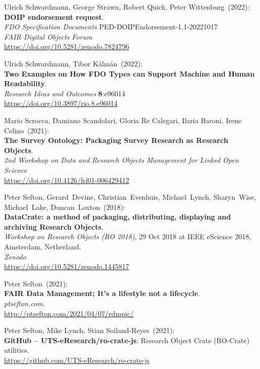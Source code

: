 \begin{thebibliography}{9}
Ulrich Schwardmann, George Strawn, Robert Quick, Peter Wittenburg~(2022): \\
\textbf{DOIP endorsement request}.\\
\emph{FDO Specification Documents} PED-DOIPEndorsement-1.1-20221017\\
\emph{FAIR Digital Objects Forum}\\
\url{https://doi.org/10.5281/zenodo.7824796}

Ulrich Schwardmann, Tibor Kálmán~(2022): \\
\textbf{Two {Examples} on {How FDO Types} can {Support Machine} and {Human Readability}}.\\
\emph{Research Ideas and Outcomes} \textbf{8}:e96014 \\
\url{https://doi.org/10.3897/rio.8.e96014}

Mario Scrocca, Damiano Scandolari, Gloria Re Calegari, Ilaria Baroni, Irene Celino~(2021): \\
\textbf{The Survey Ontology: Packaging Survey Research as Research Objects}.\\
\emph{2nd Workshop on Data and Research Objects Management for Linked Open Science}\\
\url{https://doi.org/10.4126/frl01-006429412}

Peter Sefton, Gerard~Devine, Christian~Evenhuis, Michael~Lynch, Sharyn~Wise, Michael~Lake, Duncan~Loxton~(2018): \\
\textbf{DataCrate: a method of packaging, distributing, displaying and archiving Research Objects}.\\
\emph{Workshop on Research Objects (RO 2018)}, 29 Oct 2018 at IEEE eScience 2018, Amsterdam, Netherland. \\
\emph{Zenodo}\\
\url{https://doi.org/10.5281/zenodo.1445817}

Peter Sefton~(2021): \\
\textbf{FAIR Data Management; It's a lifestyle not a lifecycle}.\\
\emph{ptsefton.com}. \\
\url{http://ptsefton.com/2021/04/07/rdmpic/}

Peter Sefton, Mike Lynch, Stian Soiland-Reyes~(2021): \\
\textbf{GitHub -- UTS-eResearch/ro-crate-js}: Research Object Crate (RO-Crate) utilities.\\
\url{https://github.com/UTS-eResearch/ro-crate-js}


\end{thebibliography}
